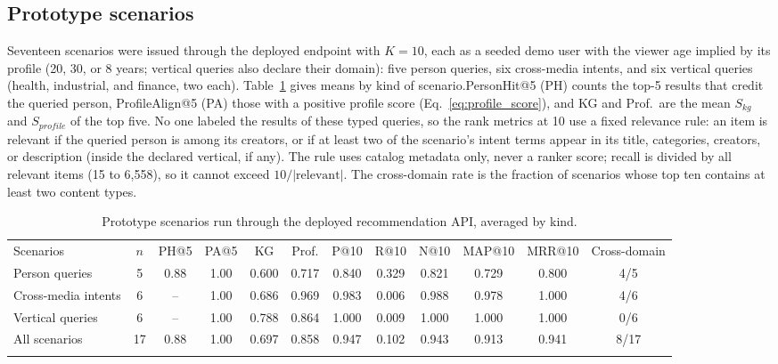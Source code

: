 \documentclass[3p,times,procedia]{elsarticle}
\begin{document}
\subsection{Prototype scenarios}
\label{sec:scenarios}
Seventeen scenarios were issued through the deployed endpoint with $K=10$, each as a seeded demo user with the viewer age implied by its profile (20, 30, or 8 years; vertical queries also declare their domain): five person queries, six cross-media intents, and six vertical queries (health, industrial, and finance, two each). Table~\ref{tab:results} gives means by kind of scenario.PersonHit@5 (PH) counts the top-5 results that credit the queried person, ProfileAlign@5 (PA) those with a positive profile score (Eq.~\eqref{eq:profile_score}), and KG and Prof.\ are the mean $S_{\mathit{kg}}$ and $S_{\mathit{profile}}$ of the top five. No one labeled the results of these typed queries, so the rank metrics at 10 use a fixed relevance rule: an item is relevant if the queried person is among its creators, or if at least two of the scenario's intent terms appear in its title, categories, creators, or description (inside the declared vertical, if any). The rule uses catalog metadata only, never a ranker score; recall is divided by all relevant items (15 to 6,558), so it cannot exceed $10/|\mathrm{relevant}|$. The cross-domain rate is the fraction of scenarios whose top ten contains at least two content types.

\begin{table}[!ht]
\centering
\caption{Prototype scenarios run through the deployed recommendation API, averaged by kind.}
\label{tab:results}
\footnotesize
\setlength{\tabcolsep}{3pt}
\begin{tabular*}{\hsize}{@{\extracolsep{\fill}}lccccccccccc@{}}
\toprule
Scenarios & $n$ & PH@5 & PA@5 & KG & Prof. & P@10 & R@10 & N@10 & MAP@10 & MRR@10 & Cross-domain \\
\colrule
Person queries & 5 & 0.88 & 1.00 & 0.600 & 0.717 & 0.840 & 0.329 & 0.821 & 0.729 & 0.800 & 4/5 \\
Cross-media intents & 6 & -- & 1.00 & 0.686 & 0.969 & 0.983 & 0.006 & 0.988 & 0.978 & 1.000 & 4/6 \\
Vertical queries & 6 & -- & 1.00 & 0.788 & 0.864 & 1.000 & 0.009 & 1.000 & 1.000 & 1.000 & 0/6 \\
\colrule
All scenarios & 17 & 0.88 & 1.00 & 0.697 & 0.858 & 0.947 & 0.102 & 0.943 & 0.913 & 0.941 & 8/17 \\
\botrule
\end{tabular*}
\end{table}
\end{document}
